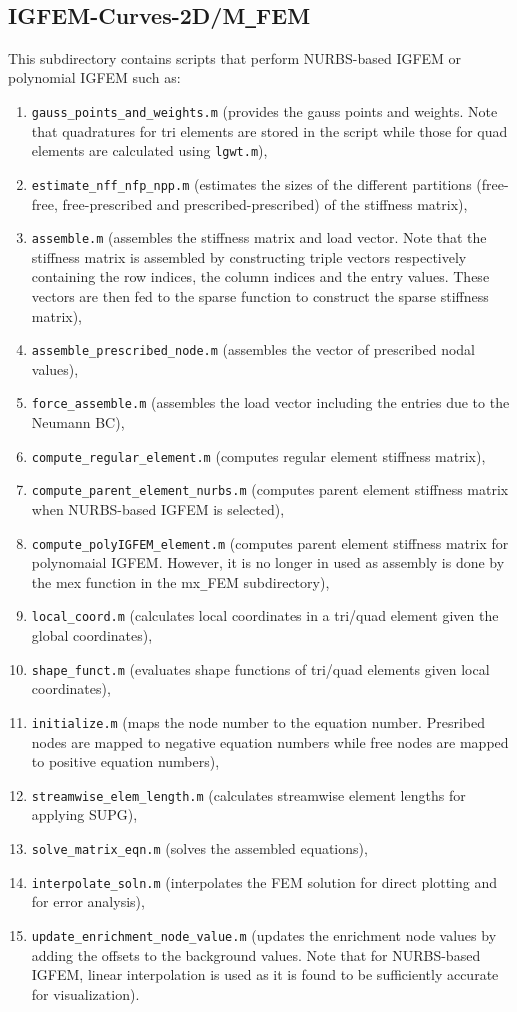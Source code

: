 \documentclass[11pt,letterpaper]{article}
\begin{document}
\subsection{IGFEM-Curves-2D/M\texttt{\_}FEM}
This subdirectory contains scripts that perform NURBS-based IGFEM or polynomial IGFEM such as:
\begin{enumerate}
\item \texttt{gauss\_points\_and\_weights.m} (provides the gauss points and weights. Note that quadratures for tri elements are stored in the script while those for quad elements are calculated using \texttt{lgwt.m}),
\item \texttt{estimate\_nff\_nfp\_npp.m} (estimates the sizes of the different partitions (free-free, free-prescribed and prescribed-prescribed) of the stiffness matrix),
\item \texttt{assemble.m} (assembles the stiffness matrix and load vector. Note that the stiffness matrix is assembled by constructing triple vectors respectively containing the row indices, the column indices and the entry values. These vectors are then fed to the sparse function to construct the sparse stiffness matrix),
\item \texttt{assemble\_prescribed\_node.m} (assembles the vector of prescribed nodal values), 
\item \texttt{force\_assemble.m} (assembles the load vector including the entries due to the Neumann BC),
\item \texttt{compute\_regular\_element.m} (computes regular element stiffness matrix),
\item \texttt{compute\_parent\_element\_nurbs.m} (computes parent element stiffness matrix when NURBS-based IGFEM is selected),
\item \texttt{compute\_polyIGFEM\_element.m} (computes parent element stiffness matrix for polynomaial IGFEM. However, it is no longer in used as assembly is done by the mex function in the mx\texttt{\_}FEM subdirectory),
\item \texttt{local\_coord.m} (calculates local coordinates in a tri/quad element given the global coordinates),
\item \texttt{shape\_funct.m} (evaluates shape functions of tri/quad elements given local coordinates),
\item \texttt{initialize.m} (maps the node number to the equation number. Presribed nodes are mapped to negative equation numbers while free nodes are mapped to positive equation numbers),
\item \texttt{streamwise\_elem\_length.m} (calculates streamwise element lengths for applying SUPG),
\item \texttt{solve\_matrix\_eqn.m}  (solves the assembled equations), 
\item \texttt{interpolate\_soln.m} (interpolates the FEM solution for direct plotting and for error analysis),
\item \texttt{update\_enrichment\_node\_value.m} (updates the enrichment node values by adding the offsets to the background values. Note that for NURBS-based IGFEM, linear interpolation is used as it is found to be sufficiently accurate for visualization).
\end{enumerate}
\end{document}
